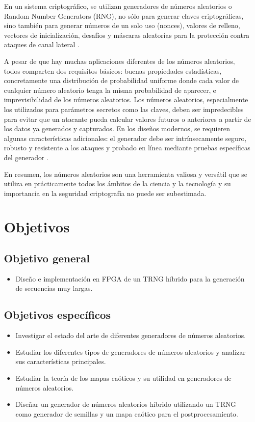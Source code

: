    En un sistema criptográfico, se utilizan generadores de números aleatorios o Random Number Generators (RNG), no sólo para generar claves criptográficas, sino también para generar números de un solo uso (nonces), valores de relleno, vectores de inicialización, desafíos y máscaras aleatorias para la protección contra ataques de canal lateral \cite{Petura2016}.

    A pesar de que hay muchas aplicaciones diferentes de los números aleatorios, todos comparten dos requisitos básicos: buenas propiedades estadísticas, concretamente una distribución de probabilidad uniforme donde cada valor de cualquier número aleatorio tenga la misma probabilidad de aparecer, e imprevisibilidad de los números aleatorios. Los números aleatorios, especialmente los utilizados para parámetros secretos como las claves, deben ser impredecibles para evitar que un atacante pueda calcular valores futuros o anteriores a partir de los datos ya generados y capturados. En los diseños modernos, se requieren algunas características adicionales: el generador debe ser intrínsecamente seguro, robusto y resistente a los ataques y probado en línea mediante pruebas específicas del generador \cite{Badrignans2011}. 

    En resumen, los números aleatorios son una herramienta valiosa y versátil que se utiliza en prácticamente todos los ámbitos de la ciencia y la tecnología y su importancia en la seguridad criptografía no puede ser subestimada.		
	
\cite{Jun1999}

	\section{Objetivos}
	
		\subsection{Objetivo general}
			\begin{itemize}
				\item Diseño e implementación en FPGA de un TRNG híbrido para la generación de secuencias muy largas.
			\end{itemize}
		
		\subsection{Objetivos específicos}
			\begin{itemize}
                \item Investigar el estado del arte de diferentes generadores de números aleatorios.
                \item Estudiar los diferentes tipos de generadores de números aleatorios y analizar sus características principales.
                \item Estudiar la teoría de los mapas caóticos y su utilidad en generadores de números aleatorios.
                \item Diseñar un generador de números aleatorios híbrido utilizando un TRNG como generador de semillas y un mapa caótico para el postprocesamiento.
			\end{itemize}
